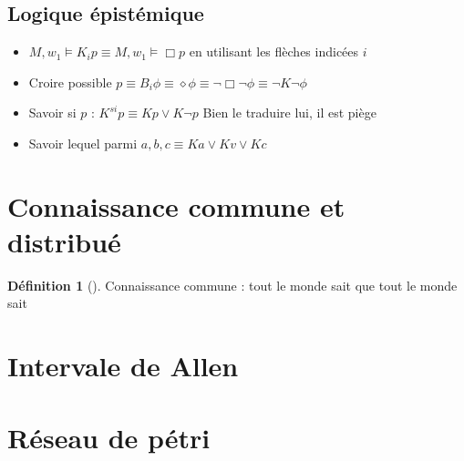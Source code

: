 \documentclass{article}
\theoremstyle{plain}%
\theoremstyle{definition}
\newtheorem{defn}{Définition}[section]
\theoremstyle{remark}
\begin{document}
\subsection{Logique épistémique}
\begin{itemize}
    \item $ M, w_1 \models K_i p \equiv M, w_1 \models \Box p $ en utilisant les flèches indicées $ i $
    \item Croire possible $ p \equiv B_i \phi \equiv \diamond \phi \equiv \neg \Box \neg \phi \equiv \neg K \neg \phi  $ 
    \item Savoir si $ p $ : $ K^{si} p \equiv K p \vee K \neg p $ Bien le traduire lui, il est piège
    \item Savoir lequel parmi $ a,b,c \equiv K a \vee K v \vee K c $ 
\end{itemize}

\section{Connaissance commune et distribué}
\begin{defn}[]
    Connaissance commune : tout le monde sait que tout le monde sait
\end{defn}


\section{Intervale de Allen}
\section{Réseau de pétri}
\end{document}
